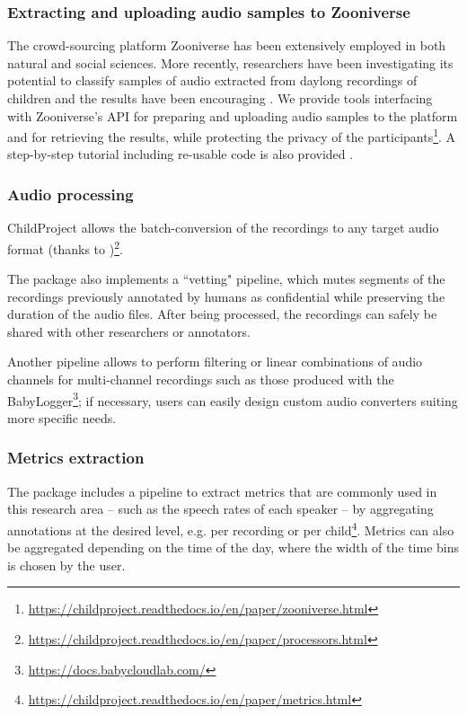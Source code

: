 \documentclass[smallextended]{svjour3}       %
\begin{document}
\subsubsection*{Extracting and uploading audio samples to Zooniverse}

The crowd-sourcing platform Zooniverse \citep{zooniverse} has been extensively employed in both natural \citep{gravityspy} and social sciences. More recently, researchers have been investigating its potential to classify samples of audio extracted from daylong recordings of children and the results have been encouraging  \citep{semenzin2020a,semenzin2020b}. We provide tools interfacing with Zooniverse's API for preparing and uploading audio samples to the platform and for retrieving the results, while protecting the privacy of the participants\footnote{\url{https://childproject.readthedocs.io/en/paper/zooniverse.html}}. A step-by-step tutorial including re-usable code is also provided \citep{zooniverse_example}.

\subsubsection*{Audio processing}

ChildProject allows the batch-conversion of the recordings to any target audio format (thanks to \citealt{ffmpeg})\footnote{\url{https://childproject.readthedocs.io/en/paper/processors.html}}.

The package also implements a ``vetting" \citep{vandam2018vetting,Cychosz2020} pipeline, which mutes segments of the recordings previously annotated by humans as confidential while preserving the duration of the audio files. After being processed, the recordings can safely be shared with other researchers or annotators.

Another pipeline allows to perform filtering or linear combinations of audio channels for multi-channel recordings such as those produced with the BabyLogger\footnote{\url{https://docs.babycloudlab.com/}}; if necessary, users can easily design custom audio converters suiting more specific needs.

\subsubsection*{Metrics extraction}

The package includes a pipeline to extract metrics that are commonly used in this research area -- such as the speech rates of each speaker -- by aggregating annotations at the desired level, e.g. per recording or per child\footnote{\url{https://childproject.readthedocs.io/en/paper/metrics.html}}. Metrics can also be aggregated depending on the time of the day, where the width of the time bins is chosen by the user.
\end{document}
